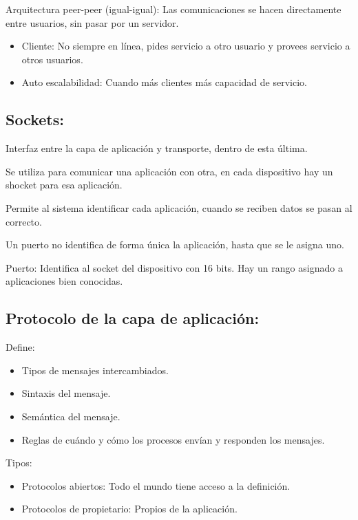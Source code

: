 \documentclass[12pt, twoside, openright]{report} %
\begin{document}
Arquitectura peer-peer (igual-igual): Las comunicaciones se hacen
directamente entre usuarios, sin pasar por un servidor.

\begin{itemize}
	\item Cliente: No siempre en línea, pides servicio a otro usuario y
	      provees servicio a otros usuarios.
	\item Auto escalabilidad: Cuando más clientes más capacidad de servicio.
\end{itemize}

\subsection{Sockets:}


Interfaz entre la capa de aplicación y transporte, dentro de esta
última.

Se utiliza para comunicar una aplicación con otra, en cada
dispositivo hay un shocket para esa aplicación.

Permite al sistema identificar cada aplicación, cuando se reciben
datos se pasan al correcto.

Un puerto no identifica de forma única la aplicación, hasta que se
le asigna uno.

Puerto: Identifica al socket del dispositivo con 16 bits. Hay un
rango asignado a aplicaciones bien conocidas.

\subsection{Protocolo de la capa de aplicación:}

Define:

\begin{itemize}
	\item Tipos de mensajes intercambiados.
	\item Sintaxis del mensaje.
	\item Semántica del mensaje.
	\item Reglas de cuándo y cómo los procesos envían y responden los
	      mensajes.
\end{itemize}

Tipos:

\begin{itemize}
	\item Protocolos abiertos: Todo el mundo tiene acceso a la definición.
	\item Protocolos de propietario: Propios de la aplicación.
\end{itemize}
\end{document}
